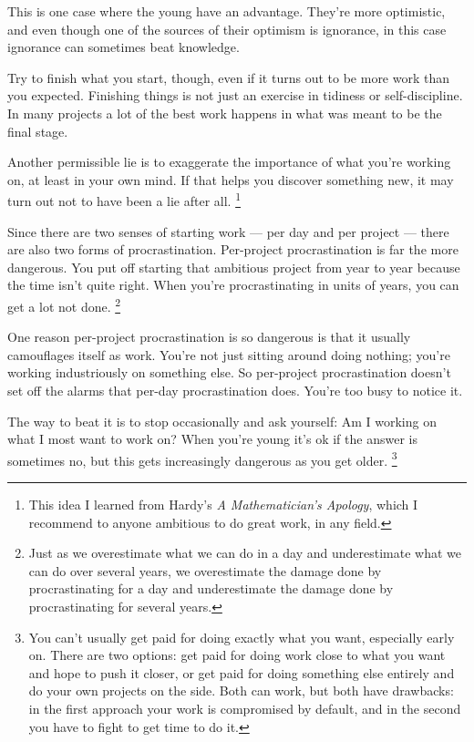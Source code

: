 \documentclass[12pt]{book}
\begin{document}
This is one case where the young have an advantage. They're more
optimistic, and even though one of the sources of their optimism is
ignorance, in this case ignorance can sometimes beat knowledge.

Try to finish what you start, though, even if it turns out to be more
work than you expected. Finishing things is not just an exercise in
tidiness or self-discipline. In many projects a lot of the best work
happens in what was meant to be the final stage.

Another permissible lie is to exaggerate the importance of what you're
working on, at least in your own mind. If that helps you discover
something new, it may turn out not to have been a lie after all.
\footnote{This idea I learned from Hardy's \emph{A Mathematician's
Apology}, which I recommend to anyone ambitious to do great work, in any
field.}

Since there are two senses of starting work --- per day and per project
--- there are also two forms of procrastination. Per-project
procrastination is far the more dangerous. You put off starting that
ambitious project from year to year because the time isn't quite right.
When you're procrastinating in units of years, you can get a lot not
done. \footnote{Just as we overestimate what we can do in a day and
underestimate what we can do over several years, we overestimate the
damage done by procrastinating for a day and underestimate the damage
done by procrastinating for several years.}

One reason per-project procrastination is so dangerous is that it
usually camouflages itself as work. You're not just sitting around doing
nothing; you're working industriously on something else. So per-project
procrastination doesn't set off the alarms that per-day procrastination
does. You're too busy to notice it.

The way to beat it is to stop occasionally and ask yourself: Am I
working on what I most want to work on? When you're young it's ok if the
answer is sometimes no, but this gets increasingly dangerous as you get
older. \footnote{You can't usually get paid for doing exactly what you want,
especially early on. There are two options: get paid for doing work
close to what you want and hope to push it closer, or get paid for doing
something else entirely and do your own projects on the side. Both can
work, but both have drawbacks: in the first approach your work is
compromised by default, and in the second you have to fight to get time
to do it.}
\end{document}
